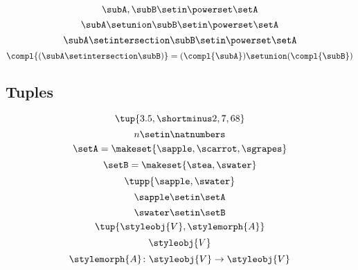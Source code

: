 {\begin{forslides}
\begin{equation}
            \label{eq:slides_session2_27}
            \subA, \subB \setin\powerset \setA
        \end{equation}
        \begin{equation}
            \label{eq:slides_session2_28}
            \subA \setunion \subB \setin\powerset \setA
        \end{equation}
        \begin{equation}
            \label{eq:slides_session2_29}
            \subA \setintersection \subB \setin\powerset \setA
        \end{equation}
        \begin{equation}
            \label{eq:slides_session2_30}
            \compl{(\subA \setintersection \subB)} = (\compl{\subA}) \setunion (\compl{\subB})
        \end{equation}

        \subsection{Tuples}

        \begin{equation}
            \label{eq:slides_session2_31}
            \tup{3.5, \shortminus 2, 7, 68}
        \end{equation}
        \begin{equation}
            \label{eq:slides_session2_32}
            n \setin \natnumbers
        \end{equation}
        \begin{equation}
            \label{eq:slides_session2_33}
            \setA = \makeset{ \sapple, \scarrot, \sgrapes}
        \end{equation}
        \begin{equation}
            \label{eq:slides_session2_34}
            \setB = \makeset{ \stea, \swater }
        \end{equation}
        \begin{equation}
            \label{eq:slides_session2_35}
            \tupp{\sapple, \swater}
        \end{equation}
        \begin{equation}
            \label{eq:slides_session2_36}
            \sapple \setin\setA
        \end{equation}
        \begin{equation}
            \label{eq:slides_session2_37}
            \swater \setin\setB
        \end{equation}
        \begin{equation}
            \label{eq:slides_session2_38}
            \tup{\styleobj{V}, \stylemorph{A}}
        \end{equation}
        \begin{equation}
            \label{eq:slides_session2_39}
            \styleobj{V}
        \end{equation}
        \begin{equation}
            \label{eq:slides_session2_40}
            \stylemorph{A}\colon \styleobj{V} \to \styleobj{V}
        \end{equation}


\end{forslides}}
